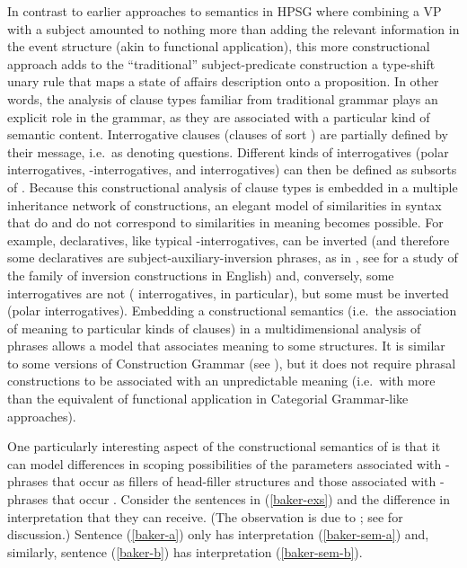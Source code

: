 \documentclass[output=paper,biblatex,babelshorthands,newtxmath,draftmode,colorlinks,citecolor=brown]{langscibook}
\begin{document}
In contrast to earlier approaches to semantics in HPSG where combining a VP with a subject amounted to nothing more than adding the relevant information in the event structure (akin to functional application), this more constructional approach adds to the ``traditional'' subject-predicate construction a type-shift unary rule that maps a state of affairs description onto a proposition. In other words, the analysis of clause types familiar from traditional grammar plays an explicit role in the grammar, as they are associated  with a particular kind of semantic content.  Interrogative clauses (clauses of sort ) are partially defined by their message, i.e.\ as denoting questions. Different kinds of interrogatives (polar interrogatives, -interrogatives, and  interrogatives) can then be defined as subsorts of . Because this constructional analysis of clause types is embedded in a multiple inheritance network of constructions, an elegant model of similarities in syntax that do and do not correspond to similarities in meaning becomes possible. For example,  declaratives, like typical -interrogatives, can be inverted (and therefore some declaratives are subject-auxiliary-inversion phrases, as in , see \citealt{Fillmore1999} for a study of the family of inversion constructions in English) and, conversely, some interrogatives are not ( interrogatives, in particular), but some must be inverted (polar interrogatives). Embedding a constructional semantics (i.e.\ the association of meaning to particular kinds of clauses) in a multidimensional analysis of phrases allows a model that associates meaning to some structures.
It is similar to some versions of Construction Grammar (see ), but it does not require phrasal constructions to be associated with an unpredictable meaning (i.e.\ with more than the equivalent of functional application in Categorial Grammar-like approaches). 

\largerpage
One particularly interesting aspect of the constructional semantics of \citet{GinzburgandSag2001} is
that it can model differences in scoping possibilities of the parameters associated with
-phrases that occur as fillers of head-filler structures and those associated with
-phrases that occur . Consider the sentences in (\ref{baker-exs}) and the
difference in interpretation that they can receive. (The observation is due to \citealt{Baker1970a};
see \citealt[242--246]{GinzburgandSag2001} for discussion.) Sentence (\ref{baker-a}) only has
interpretation (\ref{baker-sem-a}) and, similarly, sentence (\ref{baker-b}) has interpretation
(\ref{baker-sem-b}).
\end{document}
